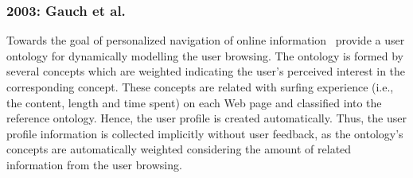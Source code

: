 
\subsubsection{2003: Gauch et al.}
\label{sec:gauch}

Towards the goal of personalized navigation of online information~\citet{gauch_ontology_based_2003}
provide a user ontology for dynamically modelling the user browsing. The ontology
is formed by several concepts which are weighted indicating the user's perceived
interest in the corresponding concept. These concepts are related with surfing
experience (i.e., the content, length and time spent) on each Web page and
classified into the reference ontology. Hence, the user profile is created 
automatically. Thus, the user profile information is collected implicitly without 
user feedback, as the ontology's concepts are automatically weighted considering 
the amount of related information from the user browsing.


